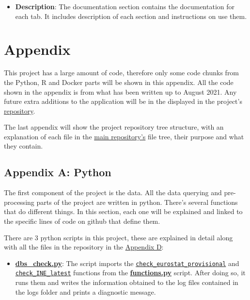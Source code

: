 \documentclass[
  a4paper]{article}
\providecommand{\tightlist}{%
  \setlength{\itemsep}{0pt}\setlength{\parskip}{0pt}}
\begin{document}
\begin{itemize}
\tightlist
\item
  \textbf{Description}: The documentation section contains the
  documentation for each tab. It includes description of each section
  and instructions on use them.
\end{itemize}

\newpage

\hypertarget{appendix}{%
\section{Appendix}\label{appendix}}

This project has a large amount of code, therefore only some code chunks
from the Python, R and Docker parts will be shown in this appendix. All
the code shown in the appendix is from what has been written up to
August 2021. Any future extra additions to the application will be in
the displayed in the project's
\href{https://github.com/dreth/tfm_uc3m}{repository}.

The last appendix will show the project repository tree structure, with
an explanation of each file in the
\href{https://github.com/dreth/tfm_uc3m}{main repository's} file tree,
their purpose and what they contain.

\hypertarget{appendix-a-python}{%
\subsection{Appendix A: Python}\label{appendix-a-python}}

The first component of the project is the data. All the data querying
and pre-processing parts of the project are written in python. There's
several functions that do different things. In this section, each one
will be explained and linked to the specific lines of code on github
that define them.

There are 3 python scripts in this project, these are explained in
detail along with all the files in the repository in the
\protect\hyperlink{AppendixD}{Appendix D}:

\begin{itemize}
\tightlist
\item
  \href{https://github.com/dreth/tfm_uc3m/blob/main/api/dbs_check.py}{\textbf{dbs\_check.py}}:
  The script imports the
  \href{https://github.com/dreth/tfm_uc3m/blob/report_ref/api/functions.py\#L50-L142}{\texttt{check\_eurostat\_provisional}}
  and
  \href{https://github.com/dreth/tfm_uc3m/blob/report_ref/api/functions.py\#L153-L187}{\texttt{check\_INE\_latest}}
  functions from the
  \href{https://github.com/dreth/tfm_uc3m/blob/main/api/functions.py}{\textbf{functions.py}}
  script. After doing so, it runs them and writes the information
  obtained to the log files contained in the logs folder and prints a
  diagnostic message.
\end{itemize}
\end{document}
